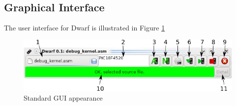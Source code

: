 \documentclass[a4paper,10pt]{article}
\begin{document}
\subsection{Graphical Interface}
The user interface for Dwarf is illustrated in Figure \ref{fig:ui}

\begin{figure}[h]
 \begin{center}
  \includegraphics[width=120mm]{doc.png}
 \end{center}
 \caption{Standard GUI appearance}
 \label{fig:ui}
\end{figure}
\end{document}
